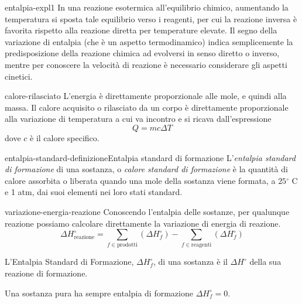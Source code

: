 \documentclass[preview]{standalone}
\begin{document}
\begin{snippet}{entalpia-expl1}
    In una reazione esotermica all'equilibrio chimico,
    aumentando la temperatura si sposta tale equilibrio verso i reagenti,
    per cui la reazione inversa è favorita rispetto alla reazione diretta
    per temperature elevate. Il segno della variazione di entalpia
    (che è un aspetto termodinamico) indica semplicemente la predisposizione della
    reazione chimica ad evolversi in senso diretto o inverso,
    mentre per conoscere la velocità di reazione è necessario considerare gli aspetti cinetici.
\end{snippet}

\begin{snippet}{calore-rilasciato}
    L'energia è direttamente proporzionale alle mole, e quindi alla massa.
    Il calore acquisito o rilasciato da un corpo è direttamente proporzionale
    alla variazione di temperatura a cui va incontro e si ricava dall'espressione
    \[
        Q = mc\Delta T
    \]
    dove \(c\) è il calore specifico.
\end{snippet}

\begin{snippetdefinition}{entalpia-standard-definizione}{Entalpia standard di formazione}
    L'\textit{entalpia standard di formazione}
    di una sostanza, o \textit{calore standard di formazione}
    è la quantità di calore assorbita o liberata quando una mole della sostanza
    viene formata, a \(25 {}^\circ \) C e 1 atm, dai suoi elementi nei loro stati standard.
\end{snippetdefinition}

\begin{snippet}{variazione-energia-reazione}
    Conoscendo l'entalpia delle sostanze, per qualunque
    reazione possiamo calcolare direttamente la variazione di energia di reazione.
    \[
        \Delta H^\circ_{\text{reazione}} =
        \sum_{f \in \text{prodotti}} \left( \Delta H^\circ_f \right) -
        \sum_{f \in \text{reagenti}} \left( \Delta H^\circ_f \right) 
    \]

    L'Entalpia Standard di Formazione,
    \(\Delta H^\circ_f\), di una sostanza è il \(\Delta H^\circ\)
    della sua reazione di formazione.

    Una sostanza pura ha sempre entalpia di formazione \(\Delta H^\circ_f = 0\).
\end{snippet}
\end{document}
